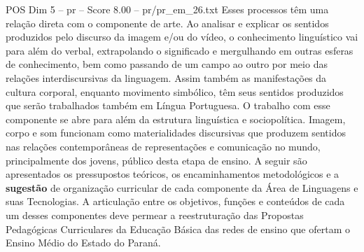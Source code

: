 \begin{textsample}{POS Dim 5 – pr – Score 8.00 – pr/pr\_em\_26.txt}
Esses processos têm uma relação direta com o componente de arte.
Ao analisar e explicar os sentidos produzidos pelo discurso da imagem e/ou do vídeo, o conhecimento linguístico vai para além do verbal, extrapolando o significado e mergulhando em outras esferas de conhecimento, bem como passando de um campo ao outro por meio das relações interdiscursivas da linguagem.
Assim também as manifestações da cultura corporal, enquanto movimento simbólico, têm seus sentidos produzidos que serão trabalhados também em Língua Portuguesa.
O trabalho com esse componente se abre para além da estrutura linguística e sociopolítica.
Imagem, corpo e som funcionam como materialidades discursivas que produzem sentidos nas relações contemporâneas de representações e comunicação no mundo, principalmente dos jovens, público desta etapa de ensino.
A seguir são apresentados os pressupostos teóricos, os encaminhamentos metodológicos e a \textbf{sugestão} de organização curricular de cada componente da Área de Linguagens e suas Tecnologias.
A articulação entre os objetivos, funções e conteúdos de cada um desses componentes deve permear a reestruturação das Propostas Pedagógicas Curriculares da Educação Básica das redes de ensino que ofertam o Ensino Médio do Estado do Paraná.

\end{textsample}
